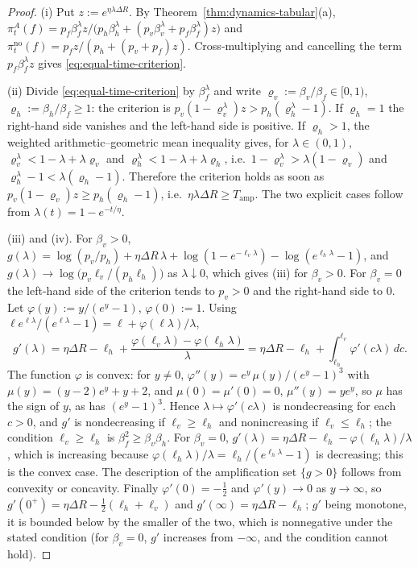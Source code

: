 \begin{proof}
(i) Put $z:=e^{\eta\lambda\Delta R}$. By
Theorem~\ref{thm:dynamics-tabular}(a),
$\pi^A_t(f)=p_f\beta_f^\lambda z/\bigl(p_h\beta_h^\lambda+(p_v\beta_v^\lambda+p_f\beta_f^\lambda)z\bigr)$
and $\pi^{\mathrm{no}}_t(f)=p_fz/(p_h+(p_v+p_f)z)$. Cross-multiplying and
cancelling the term $p_f\beta_f^\lambda z$ gives
\eqref{eq:equal-time-criterion}.

(ii) Divide \eqref{eq:equal-time-criterion} by $\beta_f^\lambda$ and write
$\varrho_v:=\beta_v/\beta_f\in[0,1)$, $\varrho_h:=\beta_h/\beta_f\ge1$:
the criterion is
$p_v(1-\varrho_v^\lambda)z>p_h(\varrho_h^\lambda-1)$. If
$\varrho_h=1$ the right-hand side vanishes and the left-hand side is
positive. If $\varrho_h>1$, the weighted arithmetic--geometric mean
inequality gives, for $\lambda\in(0,1)$,
$\varrho_v^\lambda<1-\lambda+\lambda\varrho_v$ and
$\varrho_h^\lambda<1-\lambda+\lambda\varrho_h$, i.e.\
$1-\varrho_v^\lambda>\lambda(1-\varrho_v)$ and
$\varrho_h^\lambda-1<\lambda(\varrho_h-1)$. Therefore the criterion holds
as soon as $p_v(1-\varrho_v)z\ge p_h(\varrho_h-1)$, i.e.\
$\eta\lambda\Delta R\ge T_{\mathrm{amp}}$. The two explicit cases follow
from $\lambda(t)=1-e^{-t/\eta}$.

(iii) and (iv). For $\beta_v>0$,
$g(\lambda)=\log(p_v/p_h)+\eta\Delta R\,\lambda+\log(1-e^{-\ell_v\lambda})-\log(e^{\ell_h\lambda}-1)$,
and $g(\lambda)\to\log\bigl(p_v\ell_v/(p_h\ell_h)\bigr)$ as
$\lambda\downarrow0$, which gives (iii) for $\beta_v>0$. For $\beta_v=0$
the left-hand side of the criterion tends to $p_v>0$ and the right-hand
side to $0$. Let $\varphi(y):=y/(e^y-1)$, $\varphi(0):=1$. Using
$\ell e^{\ell\lambda}/(e^{\ell\lambda}-1)=\ell+\varphi(\ell\lambda)/\lambda$,
\[
g'(\lambda)=\eta\Delta R-\ell_h+\frac{\varphi(\ell_v\lambda)-\varphi(\ell_h\lambda)}{\lambda}
=\eta\Delta R-\ell_h+\int_{\ell_h}^{\ell_v}\varphi'(c\lambda)\,dc .
\]
The function $\varphi$ is convex: for $y\neq0$,
$\varphi''(y)=e^y\,\mu(y)/(e^y-1)^3$ with $\mu(y)=(y-2)e^y+y+2$, and
$\mu(0)=\mu'(0)=0$, $\mu''(y)=ye^y$, so $\mu$ has the sign of $y$, as has
$(e^y-1)^3$. Hence $\lambda\mapsto\varphi'(c\lambda)$ is nondecreasing for
each $c>0$, and $g'$ is nondecreasing if $\ell_v\ge\ell_h$ and
nonincreasing if $\ell_v\le\ell_h$; the condition
$\ell_v\ge\ell_h$ is $\beta_f^2\ge\beta_v\beta_h$. For $\beta_v=0$,
$g'(\lambda)=\eta\Delta R-\ell_h-\varphi(\ell_h\lambda)/\lambda$, which is
increasing because $\varphi(\ell_h\lambda)/\lambda=\ell_h/(e^{\ell_h\lambda}-1)$
is decreasing; this is the convex case. The description of the amplification
set $\{g>0\}$ follows from convexity or concavity. Finally
$\varphi'(0)=-\tfrac12$ and $\varphi'(y)\to0$ as $y\to\infty$, so
$g'(0^+)=\eta\Delta R-\tfrac12(\ell_h+\ell_v)$ and
$g'(\infty)=\eta\Delta R-\ell_h$; $g'$ being monotone, it is bounded below
by the smaller of the two, which is nonnegative under the stated
condition (for $\beta_v=0$, $g'$ increases from $-\infty$, and the
condition cannot hold).
\end{proof}

